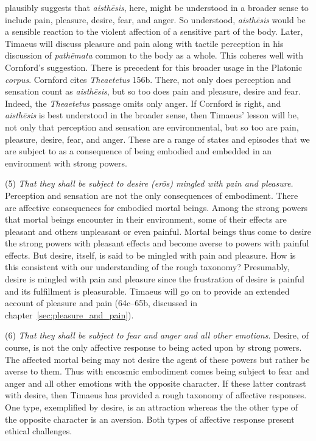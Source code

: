 \citet[143 n2]{Cornford:1935fk} plausibly suggests that \emph{aisthēsis}, here, might be understood in a broader sense to include pain, pleasure, desire, fear, and anger. So understood, \emph{aisthēsis} would be a sensible reaction to the violent affection of a sensitive part of the body. Later, Timaeus will discuss pleasure and pain along with tactile perception in his discussion of \emph{pathēmata} common to the body as a whole. This coheres well with Cornford's suggestion. There is precedent for this broader usage in the Platonic \emph{corpus}. Cornford cites \emph{Theaetetus} 156b. There, not only does perception and sensation count as \emph{aisthēsis}, but so too does pain and pleasure, desire and fear. Indeed, the \emph{Theaetetus} passage omits only anger. If Cornford is right, and \emph{aisthēsis} is best understood in the broader sense, then Timaeus' lesson will be, not only that perception and sensation are environmental, but so too are pain, pleasure, desire, fear, and anger. These are a range of states and episodes that we are subject to as a consequence of being embodied and embedded in an environment with strong powers.

(5) \emph{That they shall be subject to desire (\emph{erōs}) mingled with pain and pleasure.} Perception and sensation are not the only consequences of embodiment. There are affective consequences for embodied mortal beings.  Among the strong powers that mortal beings encounter in their environment, some of their effects are pleasant and others unpleasant or even painful. Mortal beings thus come to desire the strong powers with pleasant effects and become averse to powers with painful effects. But desire, itself, is said to be mingled with pain and pleasure. How is this consistent with our understanding of the rough taxonomy? Presumably, desire is mingled with pain and pleasure since the frustration of desire is painful and its fulfillment is pleasurable. Timaeus will go on to provide an extended account of pleasure and pain (64c--65b, discussed in chapter~\ref{sec:pleasure_and_pain}).

(6) \emph{That they shall be subject to fear and anger and all other emotions}. Desire, of course, is not the only affective response to being acted upon by strong powers. The affected mortal being may not desire the agent of these powers but rather be averse to them. Thus with encosmic embodiment comes being subject to fear and anger and all other emotions with the opposite character. If these latter contrast with desire, then Timaeus has provided a rough taxonomy of affective responses. One type, exemplified by desire, is an attraction whereas the the other type of the opposite character is an aversion. Both types of affective response present ethical challenges.


